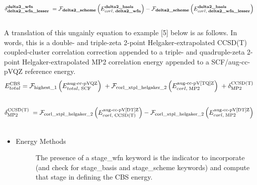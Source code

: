 \documentclass[letterpaper,10pt,english]{sphinxmanual}
\begin{document}
\begin{fulllineitems}
\begin{gather}
\begin{split}\delta_{\textbf{delta2\_wfn\_lesser}}^{\textbf{delta2\_wfn}} \; = \mathcal{F}_{\textbf{delta2\_scheme}} \left(E_{corl,\; \textbf{delta2\_wfn}}^{\textbf{delta2\_basis}}\right) - \mathcal{F}_{\textbf{delta2\_scheme}} \left(E_{corl,\; \textbf{delta2\_wfn\_lesser}}^{\textbf{delta2\_basis}}\right)\end{split}\notag\\\begin{split}\end{split}\notag
\end{gather}
A translation of this ungainly equation to example {[}5{]} below is as
follows. In words, this is a double- and triple-zeta 2-point
Helgaker-extrapolated CCSD(T) coupled-cluster correlation correction
appended to a triple- and quadruple-zeta 2-point
Helgaker-extrapolated MP2 correlation energy appended to a SCF/aug-cc-pVQZ
reference energy.
\begin{gather}
\begin{split}E_{total}^{\text{CBS}} = \mathcal{F}_{\text{highest\_1}} \left(E_{total,\; \text{SCF}}^{\text{aug-cc-pVQZ}}\right) \; + \mathcal{F}_{\text{corl\_xtpl\_helgaker\_2}} \left(E_{corl,\; \text{MP2}}^{\text{aug-cc-pV[TQ]Z}}\right) \; + \delta_{\text{MP2}}^{\text{CCSD(T)}}\end{split}\notag\\\begin{split}\end{split}\notag
\end{gather}\begin{gather}
\begin{split}\delta_{\text{MP2}}^{\text{CCSD(T)}} \; = \mathcal{F}_{\text{corl\_xtpl\_helgaker\_2}} \left(E_{corl,\; \text{CCSD(T)}}^{\text{aug-cc-pV[DT]Z}}\right) - \mathcal{F}_{\text{corl\_xtpl\_helgaker\_2}} \left(E_{corl,\; \text{MP2}}^{\text{aug-cc-pV[DT]Z}}\right)\end{split}\notag\\\begin{split}\end{split}\notag
\end{gather}\begin{itemize}
\item {} \begin{description}
\item[{Energy Methods}] \leavevmode
The presence of a stage\_wfn keyword is the indicator to incorporate
(and check for stage\_basis and stage\_scheme keywords) and compute
that stage in defining the CBS energy.


\end{description}
\end{itemize}
\end{fulllineitems}
\end{document}
